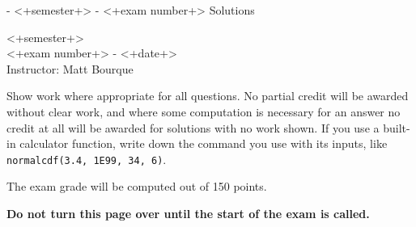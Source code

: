 

\ifprintanswers
  \centerline{ - <+semester+> - <+exam number+> Solutions}
\else
  \thispagestyle{empty}
  \begin{coverpages}


    \bigskip

    \begin{center}
      { <+semester+>}\\
      <+exam number+>  - <+date+>\\
      Instructor: Matt Bourque
    \end{center}

    \bigskip

    \noindent Show work where appropriate for all questions.
    No partial credit will be awarded without clear work, and where some computation is necessary for an answer no credit at all will be awarded for solutions with no work shown.
    If you use a built-in calculator function, write down the command you use with its inputs, like \texttt{normalcdf(3.4, 1E99, 34, 6)}.

    \bigskip

    \begin{center} 
      \gradetable[v]

      \medskip

      The exam grade will be computed out of 150 points.
    \end{center}


    \begin{center}
      \textbf{Do not turn this page over until the start of the exam is called.}
    \end{center}

  \end{coverpages}
\fi

